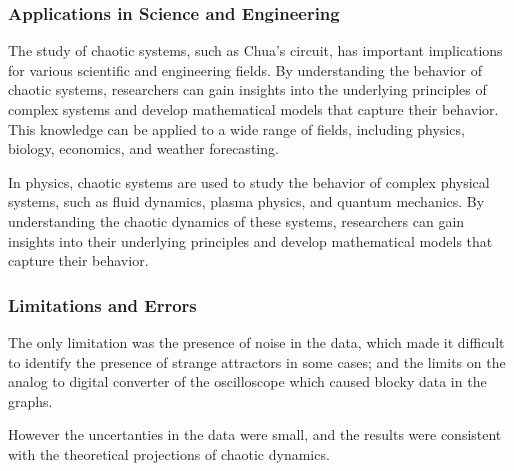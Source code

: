\documentclass[12pt]{article}
\begin{document}
                \subsubsection{Applications in Science and Engineering}
                The study of chaotic systems, such as Chua's circuit, has important implications for various scientific and engineering fields.
                By understanding the behavior of chaotic systems, researchers can gain insights into the underlying principles of complex systems
                and develop mathematical models that capture their behavior. This knowledge can be applied to a wide range of fields, including
                physics, biology, economics, and weather forecasting.

                In physics, chaotic systems are used to study the behavior of complex physical systems, such as fluid dynamics, plasma physics, and
                quantum mechanics. By understanding the chaotic dynamics of these systems, researchers can gain insights into their underlying
                principles and develop mathematical models that capture their behavior.

                \subsubsection{Limitations and Errors}
                The only limitation was the presence of noise in the data, which made it difficult to identify the presence of strange attractors in some cases;
                and the limits on the analog to digital converter of the oscilloscope which caused blocky data in the graphs.

                However the uncertanties in the data were small, and the results were consistent with the theoretical projections of chaotic dynamics.
\end{document}
